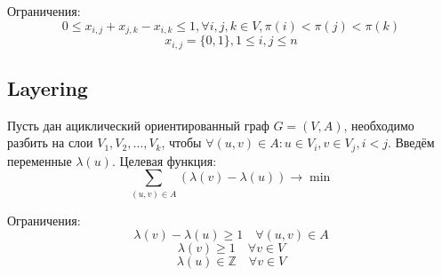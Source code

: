 \documentclass[%
10pt, %
final, %
oneside, %
onecolumn, %
centertags]{article} %
\theoremstyle{plain}
\theoremstyle{definition}
\theoremstyle{remark}
\begin{document}
Ограничения:
$$0 \leqslant x_{i,j} + x_{j,k} - x_{i,k} \leqslant 1, \forall i,j,k \in V, \pi(i)< \pi(j) < \pi(k)$$
$$x_{i,j} = \{0,1\}, 1 \leqslant i,j \leqslant n$$

\newpage
\subsection{Layering}

Пусть дан ациклический ориентированный граф $G = (V,A)$, необходимо разбить на слои $V_1, V_2,\ldots, V_k$, чтобы $\forall (u, v) \in A: u \in V_i, v \in V_j, i<j$. Введём переменные $\lambda(u)$. Целевая функция:
$$\sum\limits_{(u,v)\in A}(\lambda(v) - \lambda(u)) \to \min$$

Ограничения:
$$\lambda(v) - \lambda(u) \geqslant 1 \quad \forall (u,v) \in A$$
$$\lambda(v) \geqslant 1 \quad \forall v \in V$$
$$\lambda(u) \in \mathbb{Z} \quad \forall v \in V$$ 
\end{document}
